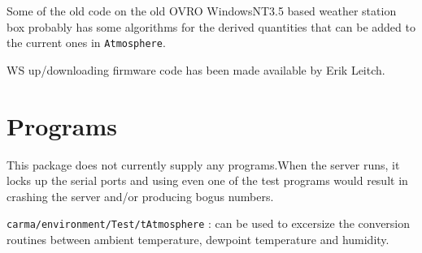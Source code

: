 \documentclass[11pt]{article}
\begin{document}
\small\noindent
Some of the old code on the old OVRO WindowsNT3.5 based weather
station box probably has some algorithms for the derived quantities 
that can be added to the current ones in {\tt Atmosphere}.

\small\noindent
WS up/downloading firmware code has been made available by Erik Leitch.


\section{Programs}

This package does not currently supply any programs.When the server runs, it
locks up the serial ports and using even one of the test programs would
result in crashing the server and/or producing bogus numbers.

\noindent
{\tt carma/environment/Test/tAtmosphere} : can be used to
excersize the conversion routines between ambient temperature, dewpoint
temperature and humidity.
\end{document}
